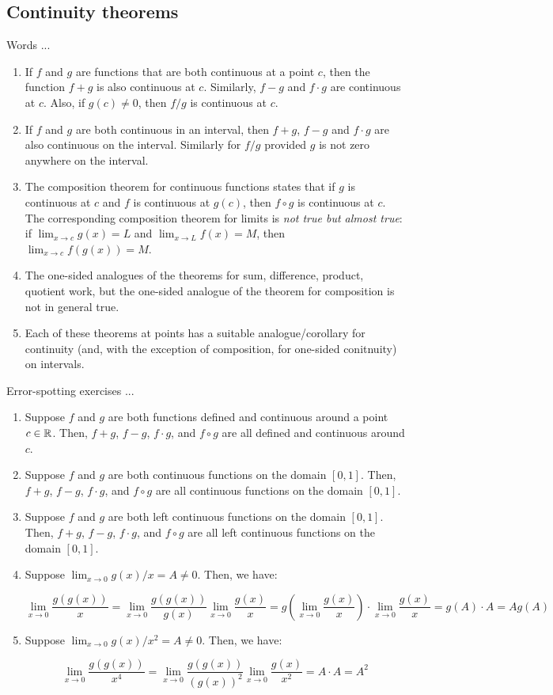 \documentclass[10pt]{amsart}
\begin{document}
\subsection{Continuity theorems}

Words ...

\begin{enumerate}
\item If $f$ and $g$ are functions that are both continuous at a point
  $c$, then the function $f + g$ is also continuous at $c$. Similarly,
  $f - g$ and $f \cdot g$ are continuous at $c$. Also, if $g(c) \ne
  0$, then $f/g$ is continuous at $c$.
\item If $f$ and $g$ are both continuous in an interval, then $f + g$,
  $f - g$ and $f \cdot g$ are also continuous on the
  interval. Similarly for $f/g$ provided $g$ is not zero anywhere on
  the interval.
\item The composition theorem for continuous functions states that if
  $g$ is continuous at $c$ and $f$ is continuous at $g(c)$, then $f
  \circ g$ is continuous at $c$. The corresponding composition theorem
  for limits is {\em not true but almost true}: if $\lim_{x \to c}
  g(x) = L$ and $\lim_{x \to L} f(x) = M$, then $\lim_{x \to c}
  f(g(x)) = M$.
\item The one-sided analogues of the theorems for sum, difference,
  product, quotient work, but the one-sided analogue of the theorem
  for composition is not in general true.
\item Each of these theorems at points has a suitable
  analogue/corollary for continuity (and, with the exception of
  composition, for one-sided conitnuity) on intervals.
\end{enumerate}

Error-spotting exercises ...

\begin{enumerate}
\item Suppose $f$ and $g$ are both functions defined and continuous
  around a point $c \in \mathbb{R}$. Then, $f + g$, $f - g$, $f \cdot g$, and
  $f \circ g$ are all defined and continuous around $c$.
\item Suppose $f$ and $g$ are both continuous functions on the domain
  $[0,1]$. Then, $f + g$, $f - g$, $f \cdot g$, and $f \circ g$ are
  all continuous functions on the domain $[0,1]$.
\item Suppose $f$ and $g$ are both left continuous functions on the
  domain $[0,1]$. Then, $f + g$, $f - g$, $f \cdot g$, and $f \circ g$
  are all left continuous functions on the domain $[0,1]$.
\item Suppose $\lim_{x \to 0} g(x)/x = A \ne 0$. Then, we have:

  $$\lim_{x \to 0} \frac{g(g(x))}{x} = \lim_{x \to 0} \frac{g(g(x))}{g(x)} \lim_{x \to 0} \frac{g(x)}{x} = g \left(\lim_{x \to 0} \frac{g(x)}{x}\right) \cdot \lim_{x \to 0} \frac{g(x)}{x} = g(A) \cdot A = Ag(A)$$
\item Suppose $\lim_{x \to 0} g(x)/x^2 = A \ne 0$. Then, we have:

  $$\lim_{x \to 0} \frac{g(g(x))}{x^4} = \lim_{x \to 0} \frac{g(g(x))}{(g(x))^2} \lim_{x \to 0} \frac{g(x)}{x^2} = A \cdot A = A^2$$
\end{enumerate}
\end{document}
